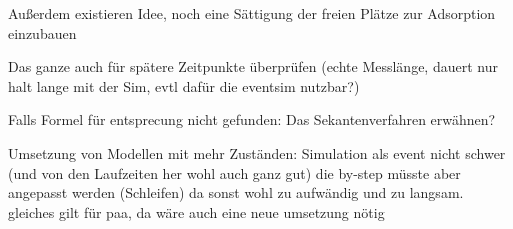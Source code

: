 Außerdem existieren Idee, noch eine Sättigung der freien Plätze zur Adsorption einzubauen

Das ganze auch für spätere Zeitpunkte überprüfen (echte Messlänge, dauert nur halt lange mit der Sim, evtl dafür die eventsim nutzbar?)


Falls Formel für entsprecung nicht gefunden: Das Sekantenverfahren erwähnen?

Umsetzung von Modellen mit mehr Zuständen: Simulation als event nicht schwer (und von den Laufzeiten her wohl auch ganz gut) die by-step müsste aber angepasst werden (Schleifen) da sonst wohl zu aufwändig und zu langsam. gleiches gilt für paa, da wäre auch eine neue umsetzung nötig